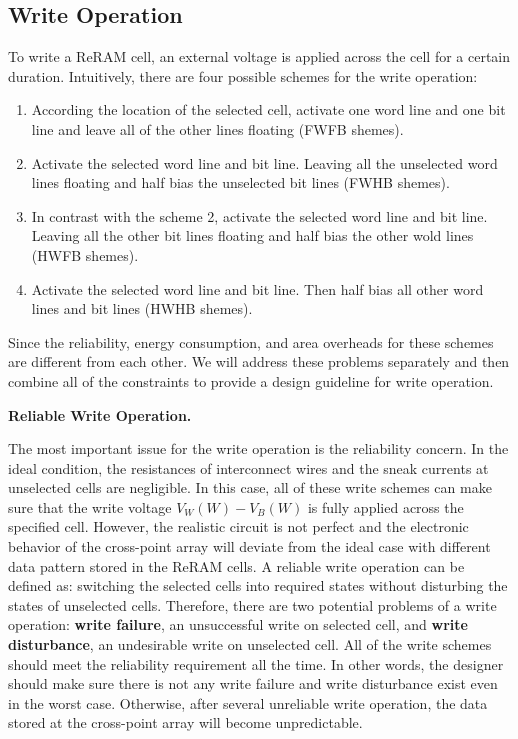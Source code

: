 \subsection{Write Operation}
To write a ReRAM cell, an external voltage is applied across the cell for a certain duration. Intuitively, there are four possible schemes for the write operation:
\begin{enumerate}
  \item According the location of the selected cell, activate one word line and one bit line and leave all of the other lines floating (FWFB shemes).
  \item Activate the selected word line and bit line. Leaving all the unselected word lines floating and half bias the unselected bit lines (FWHB shemes).
  \item In contrast with the scheme 2, activate the selected word line and bit line. Leaving all the other bit lines floating and half bias the other wold lines (HWFB shemes).
  \item Activate the selected word line and bit line. Then half bias all other word lines and bit lines (HWHB shemes).
\end{enumerate}
Since the reliability, energy consumption, and area overheads for these
schemes are different from each other. We will address these problems
separately and then combine all of the constraints to provide a design
guideline for write operation.

\vspace{6pt} \textbf{Reliable Write Operation.} \vspace{6pt}

The most important issue for the write operation is the reliability
concern. In the ideal condition, the resistances of interconnect wires and the sneak currents at unselected cells are negligible. In this case, all of these write schemes can make sure that the write voltage $V_W(W)-V_B(W)$ is fully applied across the specified cell. However, the realistic circuit is not perfect and the electronic behavior of the cross-point array will deviate from the ideal case with different
data pattern stored in the ReRAM cells. A reliable write operation can be defined as: switching the selected cells into required states without disturbing the states of unselected cells. Therefore, there are two potential problems of a write operation: \textbf{write failure}, an unsuccessful write on selected cell, and \textbf{write disturbance}, an undesirable write on unselected cell. All of the write schemes should meet the reliability requirement all the time. In other words, the designer should make sure there is not any write failure and write disturbance exist even in the worst case. Otherwise, after several unreliable write operation, the data stored at the cross-point array will become unpredictable.

